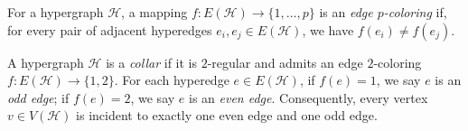 \documentclass[12pt,reqno]{amsart}
\begin{document}
\begin{definition}\label{def:edge_coloring}
For a hypergraph $\mathcal{H}$, a mapping $f:E(\mathcal{H})\rightarrow\{1,\dots,p\}$ is an \textit{edge $p$-coloring} if, for every pair of adjacent hyperedges $e_i, e_j \in E(\mathcal{H})$, we have $f(e_i) \neq f(e_j)$.
\end{definition}

\begin{definition}\label{def:collar}
A hypergraph $\mathcal{H}$ is a \textit{collar} if it is $2$-regular and admits an edge $2$-coloring $f:E(\mathcal{H})\rightarrow\{1,2\}$. For each hyperedge $e \in E(\mathcal{H})$, if $f(e)=1$, we say $e$ is an \textit{odd edge}; if $f(e)=2$, we say $e$ is an \textit{even edge}. Consequently, every vertex $v \in V(\mathcal{H})$ is incident to exactly one even edge and one odd edge.
\end{definition}
\end{document}
